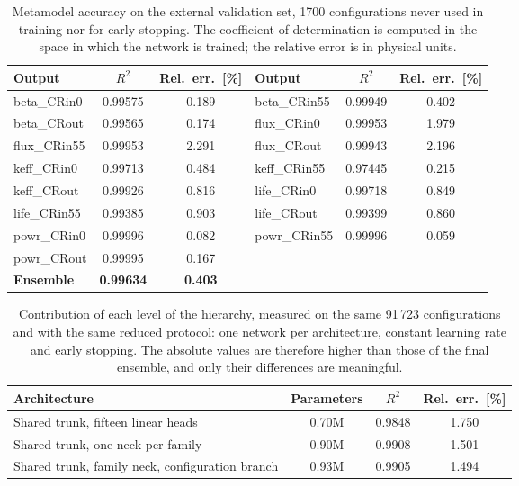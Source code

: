 \begin{table}[htbp]
\centering
\caption{Metamodel accuracy on the external validation set, 1700 configurations
never used in training nor for early stopping. The coefficient of determination
is computed in the space in which the network is trained; the relative error is
in physical units.}
\label{tab:accuracy}
\begin{tabular}{|lcc|lcc|}
\hline
Output & $R^2$ & Rel.\ err.\ [\%] & Output & $R^2$ & Rel.\ err.\ [\%] \\ \hline
    beta\_CRin0 & 0.99575 & 0.189 & beta\_CRin55 & 0.99949 & 0.402 \\
    beta\_CRout & 0.99565 & 0.174 & flux\_CRin0 & 0.99953 & 1.979 \\
    flux\_CRin55 & 0.99953 & 2.291 & flux\_CRout & 0.99943 & 2.196 \\
    keff\_CRin0 & 0.99713 & 0.484 & keff\_CRin55 & 0.97445 & 0.215 \\
    keff\_CRout & 0.99926 & 0.816 & life\_CRin0 & 0.99718 & 0.849 \\
    life\_CRin55 & 0.99385 & 0.903 & life\_CRout & 0.99399 & 0.860 \\
    powr\_CRin0 & 0.99996 & 0.082 & powr\_CRin55 & 0.99996 & 0.059 \\
    powr\_CRout & 0.99995 & 0.167 & & & \\ \hline
    \textbf{Ensemble} & \textbf{0.99634} & \textbf{0.403} & & & \\ \hline
\end{tabular}
\end{table}

\begin{table}[htbp]
\centering
\caption{Contribution of each level of the hierarchy, measured on the same
91\,723 configurations and with the same reduced protocol: one network per
architecture, constant learning rate and early stopping. The absolute values are
therefore higher than those of the final ensemble, and only their differences
are meaningful.}
\label{tab:ablation}
\begin{tabular}{|l|c|c|c|}
\hline
Architecture & Parameters & $R^2$ & Rel.\ err.\ [\%] \\ \hline
    Shared trunk, fifteen linear heads & 0.70M & 0.9848 & 1.750 \\
    Shared trunk, one neck per family & 0.90M & 0.9908 & 1.501 \\
    Shared trunk, family neck, configuration branch & 0.93M & 0.9905 & 1.494 \\
\hline
\end{tabular}
\end{table}

